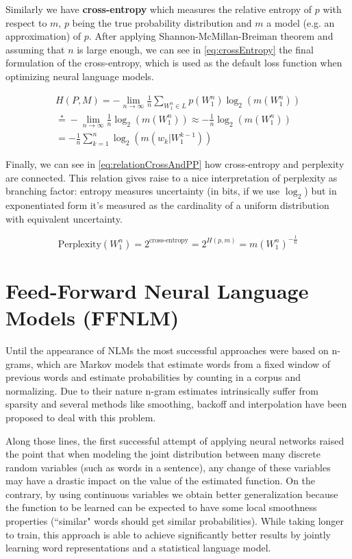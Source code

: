 Similarly we have \textbf{cross-entropy} which measures the relative entropy of $p$ with respect to $m$, $p$ being the true probability distribution and $m$ a model (e.g. an approximation) of $p$. After applying Shannon-McMillan-Breiman theorem and assuming that $n$ is large enough, we can see in \autoref{eq:crossEntropy} the final formulation of the cross-entropy, which is used as the default loss function when optimizing neural language models.

\begin{equation} \label{eq:crossEntropy}
	\begin{gathered}
		H(P,M) = -\lim\limits_{n \rightarrow \infty}\frac{1}{n}\sum_{W_1^n \in L}p(W_1^n)\log_2(m(W_1^n)) \\
		\stackrel{*}{=} -\lim\limits_{n \rightarrow \infty}\frac{1}{n}\log_2(m(W_1^n)) \approx -\frac{1}{n}\log_2(m(W_1^n)) \\
		= -\frac{1}{n}\sum_{k=1}^{n}\log_2(m(w_k|W_{1}^{k-1}))
	\end{gathered}
\end{equation}

Finally, we can see in \autoref{eq:relationCrossAndPP} how cross-entropy and perplexity are connected. This relation gives raise to a nice interpretation of perplexity as branching factor: entropy measures uncertainty (in bits, if we use $\log_2$) but in exponentiated form it's measured as the cardinality of a uniform distribution with equivalent uncertainty.

\begin{equation} \label{eq:relationCrossAndPP}
	\text{Perplexity}(W_1^n) = 2^{\text{cross-entropy}} = 2^{H(p,m)} = m(W_1^n)^{-\frac{1}{n}}
\end{equation}

\section{Feed-Forward Neural Language Models (FFNLM)}
\label{sec:forwardnlm}

Until the appearance of NLMs the most successful approaches were based on n-grams, which are Markov models that estimate words from a fixed window of previous
words and estimate probabilities by counting in a corpus and normalizing. Due to their nature n-gram estimates intrinsically suffer from sparsity and several methods like smoothing, backoff and interpolation have been proposed to deal with this problem.

Along those lines, the first successful attempt of applying neural networks \cite{bengio2003neural} raised the point that when modeling the joint distribution between many discrete random variables (such as words in a sentence), any change of these variables may have a drastic impact on the value of the estimated function. On the contrary, by using continuous variables we obtain better generalization because the function to be learned can be expected to have some local smoothness properties (``similar" words should get similar probabilities). While taking longer to train, this approach is able to achieve significantly better results by jointly learning word representations and a statistical language model.

